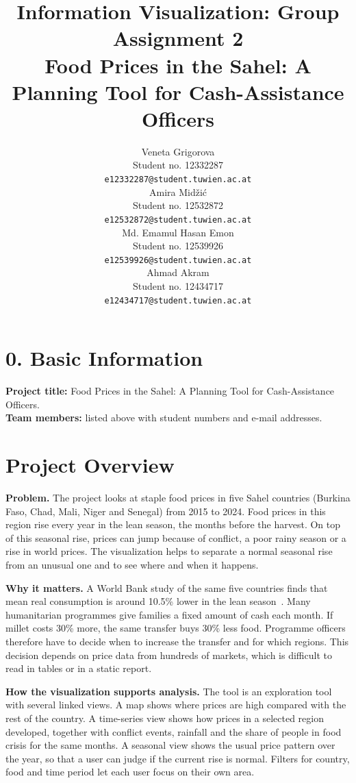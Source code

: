 \documentclass{article}
\title{Information Visualization: Group Assignment 2\\[0.3em]
\large Food Prices in the Sahel: A Planning Tool for Cash-Assistance Officers}
\author{
  Veneta Grigorova \\ Student no. 12332287 \\ \texttt{e12332287@student.tuwien.ac.at} \\[1em]
  Amira Midžić \\ Student no. 12532872 \\ \texttt{e12532872@student.tuwien.ac.at} \\[1em]
  Md. Emamul Hasan Emon \\ Student no. 12539926 \\ \texttt{e12539926@student.tuwien.ac.at} \\[1em]
  Ahmad Akram \\ Student no. 12434717 \\ \texttt{e12434717@student.tuwien.ac.at}
}
\date{}
\begin{document}
\maketitle

\section*{0. Basic Information}

\textbf{Project title:} Food Prices in the Sahel: A Planning Tool for Cash-Assistance Officers.\\
\textbf{Team members:} listed above with student numbers and e-mail addresses.

\section{Project Overview}

\textbf{Problem.} The project looks at staple food prices in five Sahel countries (Burkina Faso, Chad, Mali, Niger and Senegal) from 2015 to 2024. Food prices in this region rise every year in the lean season, the months before the harvest. On top of this seasonal rise, prices can jump because of conflict, a poor rainy season or a rise in world prices. The visualization helps to separate a normal seasonal rise from an unusual one and to see where and when it happens.

\textbf{Why it matters.} A World Bank study of the same five countries finds that mean real consumption is around 10.5\% lower in the lean season~\cite{lain2023}. Many humanitarian programmes give families a fixed amount of cash each month. If millet costs 30\% more, the same transfer buys 30\% less food. Programme officers therefore have to decide when to increase the transfer and for which regions. This decision depends on price data from hundreds of markets, which is difficult to read in tables or in a static report.

\textbf{How the visualization supports analysis.} The tool is an exploration tool with several linked views. A map shows where prices are high compared with the rest of the country. A time-series view shows how prices in a selected region developed, together with conflict events, rainfall and the share of people in food crisis for the same months. A seasonal view shows the usual price pattern over the year, so that a user can judge if the current rise is normal. Filters for country, food and time period let each user focus on their own area.
\end{document}
